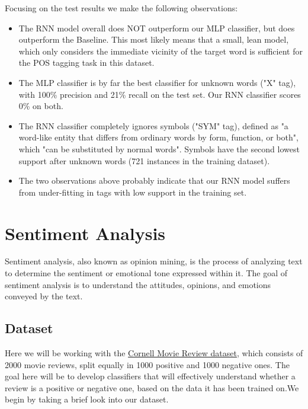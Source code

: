 \documentclass[10pt, a4paper]{article}
\begin{document}
	Focusing on the test results we make the following observations:
	\begin{itemize}
		\item The RNN model overall does NOT outperform our MLP classifier, but does outperform the Baseline. This most likely means that a small, lean model, which only considers the immediate vicinity of the target word is sufficient for the POS tagging task in this dataset.
		
		\item The MLP classifier is by far the best classifier for unknown words ("X" tag), with 100\% precision and 21\% recall on the test set. Our RNN classifier scores 0\% on both.
		
		\item The RNN classifier completely ignores symbols ("SYM" tag), defined as "a word-like entity that differs from ordinary words by form, function, or both", which "can be substituted by normal words". Symbols have the second lowest support after unknown words (721 instances in the training dataset).
		
		\item The two observations above probably indicate that our RNN model suffers from under-fitting in tags with low support in the training set.
	
	\end{itemize}
	
	
	
	
	
	
	
	
	
	\section{Sentiment Analysis}
	
	Sentiment analysis, also known as opinion mining, is the process of analyzing text to determine the sentiment or emotional tone expressed within it. The goal of sentiment analysis is to understand the attitudes, opinions, and emotions conveyed by the text. 
	
	
	\subsection{Dataset}
	Here we will be working with the \href{http://www.cs.cornell.edu/people/pabo/movie-review-data/}{Cornell Movie Review dataset}, which consists of 2000 movie reviews, split equally in 1000 positive and 1000 negative ones. The goal here will be to develop classifiers that will effectively understand whether a review is a positive or negative one, based on the data it has been trained on.We begin by taking a brief look into our dataset.
	
\end{document}
